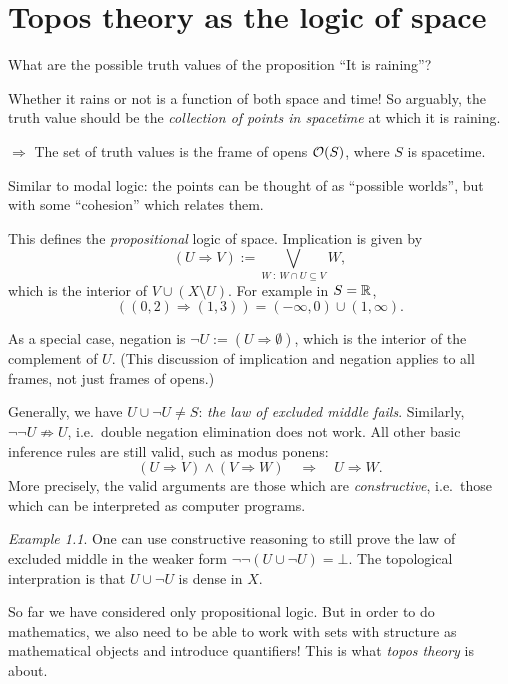 \documentclass[11pt, oneside, article]{memoir}
\theoremstyle{plain}
\theoremstyle{definition}
\theoremstyle{remark}
\newtheorem{example}[theorem]{Example}
\begin{document}
\chapter{Topos theory as the logic of space}

What are the possible truth values of the proposition ``It is raining''?

Whether it rains or not is a function of both space and time! So arguably, the truth value should be the \emph{collection of points in spacetime} at which it is raining. 

$\Rightarrow$ The set of truth values is the frame of opens $\mathcal{O}(S)$, where $S$ is spacetime. 

Similar to modal logic: the points can be thought of as ``possible worlds'', but with some ``cohesion'' which relates them.

This defines the \emph{propositional} logic of space. Implication is given by
\[
	(U \Rightarrow V) := \bigvee_{W \: : \: W \cap U \subseteq V} W,
\]
which is the interior of $V\cup (X\setminus U)$. For example in $S = \mathbb{R}$,
\[
	((0,2) \Rightarrow (1,3)) = (-\infty, 0) \cup (1,\infty).
\]

As a special case, negation is $\lnot U := (U \Rightarrow \emptyset)$, which is the interior of the complement of $U$. (This discussion of implication and negation applies to all frames, not just frames of opens.)

Generally, we have $U \cup \lnot U \neq S$: \emph{the law of excluded middle fails}. Similarly, $\lnot\lnot U \not\Rightarrow U$, i.e.~double negation elimination does not work. All other basic inference rules are still valid, such as modus ponens: 
\[
	(U \Rightarrow V) \land (V\Rightarrow W) \quad \Rightarrow \quad U \Rightarrow W.
\]
More precisely, the valid arguments are those which are \emph{constructive}, i.e.~those which can be interpreted as computer programs.

\begin{example}
One can use constructive reasoning to still prove the law of excluded middle in the weaker form $\lnot\lnot(U \cup \lnot U) = \bot$. The topological interpration is that $U \cup \lnot U$ is dense in $X$.
\end{example}

So far we have considered only propositional logic. But in order to do mathematics, we also need to be able to work with sets with structure as mathematical objects and introduce quantifiers! This is what \emph{topos theory} is about.
\end{document}
